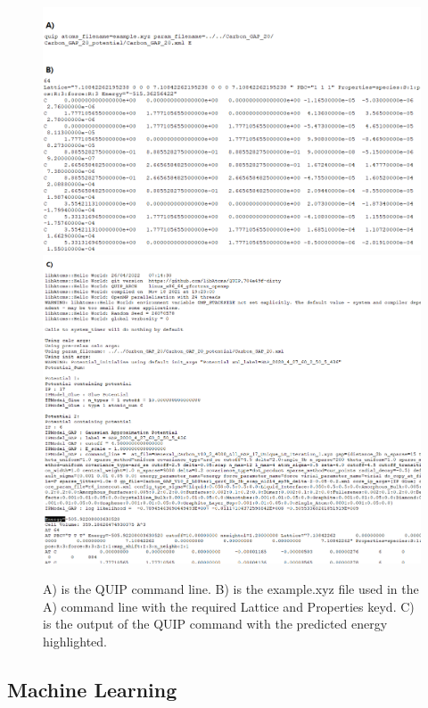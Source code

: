 \documentclass[12pt, abstract = true]{scrartcl}
\begin{document}
\begin{figure}
  \centering
  \includegraphics[scale=.5]{quip.png}
  \includegraphics[scale=.5]{quip4.png}
  
  \caption{A) is the QUIP command line. B) is the example.xyz file used in the A) command line with the required Lattice and Properties keyd. C) is the output of the QUIP command with the predicted energy highlighted. }\label{fig:quip}
\end{figure}


\newpage


\subsection{Machine Learning}
\end{document}
